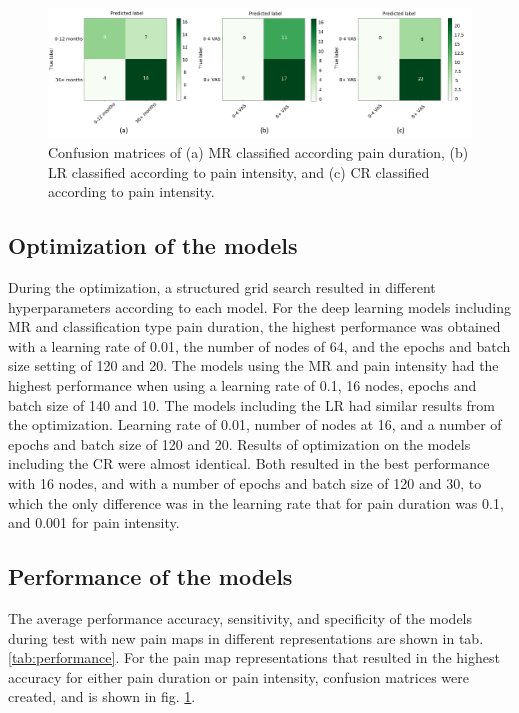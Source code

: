 \begin{figure} [b!]
\begin{tcolorbox}[colframe=black!30!black, colback=white]
    \includegraphics[width=1\textwidth]{Figures/samcon}
  \caption{Confusion matrices of (a) MR classified according pain duration, (b) LR classified according to pain intensity, and (c) CR classified according to pain intensity.}
  \label{fig:confma}
\end{tcolorbox}
\end{figure}

\subsection*{Optimization of the models}
During the optimization, a structured grid search resulted in different hyperparameters according to each model. For the deep learning models including MR and classification type pain duration, the highest performance was obtained with a learning rate of 0.01, the number of nodes of 64, and the epochs and batch size setting of 120 and 20. The models using the MR and pain intensity had the highest performance when using a learning rate of 0.1, 16 nodes, epochs and batch size of 140 and 10. The models including the LR had similar results from the optimization. Learning rate of 0.01, number of nodes at 16, and a number of epochs and batch size of 120 and 20. 
Results of optimization on the models including the CR were almost identical. Both resulted in the best performance with 16 nodes, and with a number of epochs and batch size of 120 and 30, to which the only difference was in the learning rate that for pain duration was 0.1, and 0.001 for pain intensity.

\subsection*{Performance of the models}
The average performance accuracy, sensitivity, and specificity of the models during test with new pain maps in different representations are shown in tab. \ref{tab:performance}. \newline
For the pain map representations that resulted in the highest accuracy for either pain duration or pain intensity, confusion matrices were created, and is shown in fig. \ref{fig:confma}.